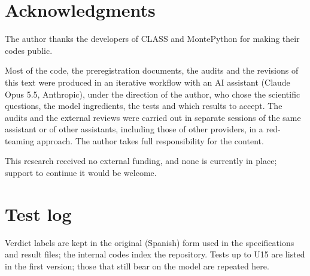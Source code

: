 \documentclass[11pt,a4paper]{article}
\begin{document}
\section*{Acknowledgments}

The author thanks the developers of CLASS and MontePython for making their codes public.

Most of the code, the preregistration documents, the audits and the revisions of this text were produced in an iterative workflow with an AI assistant (Claude Opus 5.5, Anthropic), under the direction of the author, who chose the scientific questions, the model ingredients, the tests and which results to accept.
The audits and the external reviews were carried out in separate sessions of the same assistant or of other assistants, including those of other providers, in a red-teaming approach.
The author takes full responsibility for the content.

This research received no external funding, and none is currently in place; support to continue it would be welcome.

\appendix
\section{Test log}
\label{app:log}

Verdict labels are kept in the original (Spanish) form used in the specifications and result files; the internal codes index the repository.
Tests up to U15 are listed in the first version; those that still bear on the model are repeated here.
\end{document}
